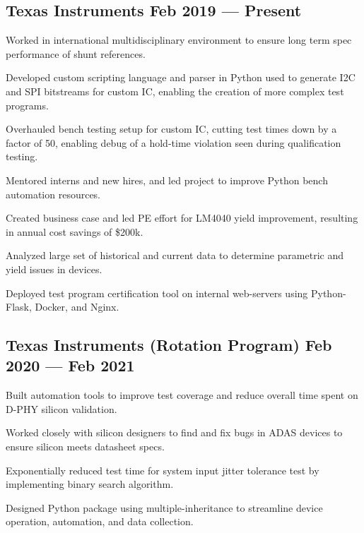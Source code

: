 \documentclass[letter,10pt]{article}
\begin{document}
\subsection{{Texas Instruments \hfill Feb 2019 --- Present}}
\begin{zitemize}
\item Worked in international multidisciplinary environment to ensure long term spec performance of shunt references.
\item Developed custom scripting language and parser in Python used to generate I2C and SPI bitstreams for custom IC, enabling the creation of more complex test programs. 
\item Overhauled bench testing setup for custom IC, cutting test times down by a factor of 50, enabling debug of a hold-time violation seen during qualification testing. 
\item Mentored interns and new hires, and led project to improve Python bench automation resources. 
\item Created business case and led PE effort for LM4040 yield improvement, resulting in annual cost savings of \$200k. 
\item Analyzed large set of historical and current data to determine parametric and yield issues in devices. 
\item Deployed test program certification tool on internal web-servers using Python-Flask, Docker, and Nginx.
\end{zitemize}

\subsection{{Texas Instruments (Rotation Program) \hfill Feb 2020 --- Feb 2021}}
\begin{zitemize}
\item Built automation tools to improve test coverage and reduce overall time spent on D-PHY silicon validation.
\item Worked closely with silicon designers to find and fix bugs in ADAS devices to ensure silicon meets datasheet specs.
\item Exponentially reduced test time for system input jitter tolerance test by implementing binary search algorithm. 
\item Designed Python package using multiple-inheritance to streamline device operation, automation, and data collection.
\end{zitemize}
\end{document}

